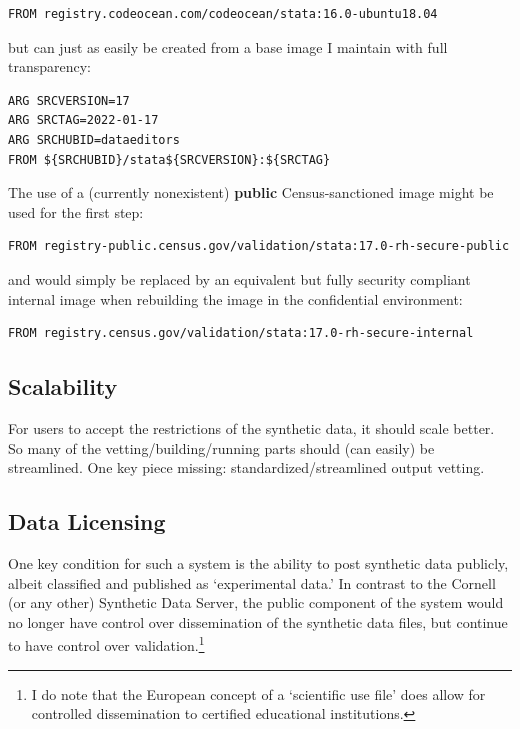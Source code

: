 \documentclass[inline]{hdsr}
\begin{document}
\begin{lstlisting}[language=docker]
FROM registry.codeocean.com/codeocean/stata:16.0-ubuntu18.04
\end{lstlisting}

\noindent but can just as easily be created from a base image I maintain with full transparency:

\begin{lstlisting}[language=docker]
ARG SRCVERSION=17
ARG SRCTAG=2022-01-17
ARG SRCHUBID=dataeditors
FROM ${SRCHUBID}/stata${SRCVERSION}:${SRCTAG}
\end{lstlisting}

\noindent The use of a  (currently nonexistent) \textbf{public}  Census-sanctioned image might be used for the first step:

\begin{lstlisting}[language=docker]
FROM registry-public.census.gov/validation/stata:17.0-rh-secure-public
\end{lstlisting}

\noindent and would simply be replaced by an equivalent but fully security compliant internal image when rebuilding the image in the confidential environment:

\begin{lstlisting}[language=docker]
FROM registry.census.gov/validation/stata:17.0-rh-secure-internal
\end{lstlisting}



\subsection{Scalability}

For users to accept the restrictions of the synthetic data, it should scale better. So many of the vetting/building/running parts should (can easily) be streamlined. One key piece missing: standardized/streamlined output vetting.

\subsection{Data Licensing}

One key condition for such a system is the ability to post synthetic data publicly, albeit  classified and published as `experimental data.' In contrast to the Cornell (or any other) Synthetic Data Server, the public component of the system would no longer have control over dissemination of the synthetic data files, but continue to have control over validation.\footnote{I do note that the European concept of a `scientific use file' does allow for controlled dissemination to certified educational institutions.}
\end{document}
